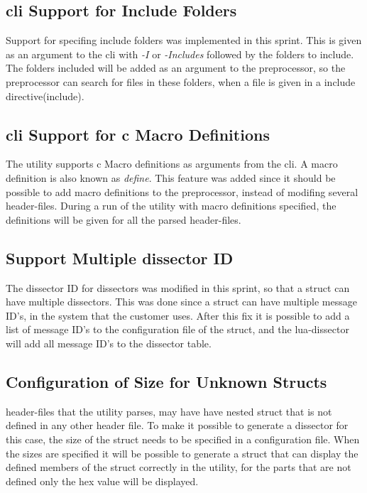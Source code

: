 \subsection{\gls{cli} Support for Include Folders}
Support for specifing include folders was implemented in this sprint. This is 
given as an argument to the \gls{cli} with  \emph{-I} or \emph{-Includes} followed 
by the folders to include. The folders included will be added as an argument 
to the \gls{preprocessor}, so the \gls{preprocessor} can search for files in these 
folders, when a file is given in a include directive(\gls{include}). 

\subsection{\gls{cli} Support for \Gls{c} Macro Definitions}
The \gls{utility} supports \Gls{c} Macro definitions as arguments from the \gls{cli}. A macro 
definition is also known as \emph{\gls{define}}. This feature was added since it 
should be possible to add macro definitions to the \gls{preprocessor}, instead of 
modifing several \gls{header}-files. During a run of the \gls{utility} with macro 
definitions specified, the definitions will be given for all the parsed 
\gls{header}-files.

\subsection{Support Multiple \gls{dissector} ID }
The \gls{dissector} ID for \glspl{dissector} was modified in this sprint, so that a \gls{struct} 
can have multiple \glspl{dissector}. This was done since a \gls{struct} can have multiple 
message ID's, in the system that the customer uses. After this fix it is 
possible to add a list of message ID's to the configuration file of the 
\gls{struct}, and the \Gls{lua}-\gls{dissector} will add all message ID's to the \gls{dissector} table.

\subsection{Configuration of Size for Unknown Structs}
\Gls{header}-files that the \gls{utility} parses, may have have nested \gls{struct} that is not 
defined in any other \gls{header} file. To make it possible to generate a 
\gls{dissector} for this case, the size of the \gls{struct} needs to be specified
in a configuration file. When the sizes are specified it will be possible to 
generate a \gls{struct} that can display the defined \glspl{member} of the \gls{struct} correctly 
in the \gls{utility}, for the parts that are not defined only the hex value will be 
displayed. 

